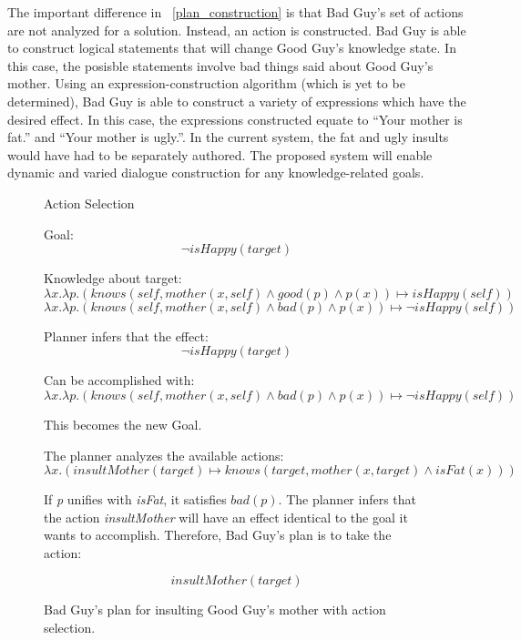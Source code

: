 \documentclass{article}
\begin{document}
The important difference in ~\ref{plan_construction} is that Bad Guy's
set of actions are not analyzed for a solution.  Instead, an action
is constructed.  Bad Guy is able to construct logical statements
that will change Good Guy's knowledge state.  In this case, the posisble
statements involve bad things said about Good Guy's mother.  Using
an expression-construction algorithm (which is yet to be determined),
Bad Guy is able to construct a variety of expressions which have the
desired effect.  In this case, the expressions constructed equate to
``Your mother is fat.'' and ``Your mother is ugly.''.  In the current
system, the fat and ugly insults would have had to be separately
authored.  The proposed system will enable dynamic and varied
dialogue construction for any knowledge-related goals.

\begin{figure}[h!]
  
  \begin{center}\large{Action Selection}\end{center}

  Goal:
  $$
  \neg isHappy(target)
  $$

  Knowledge about target:
  \[
  \lambda x.\lambda p.(knows(self, mother(x,self) \wedge good(p) \wedge p(x)) \mapsto isHappy(self))
  \]
  \[
  \lambda x.\lambda p.(knows(self, mother(x,self) \wedge bad(p) \wedge p(x)) \mapsto \neg isHappy(self))
  \]

  Planner infers that the effect:
  \[
  \neg isHappy(target)
  \]

  Can be accomplished with:
  \[
  \lambda x.\lambda p.(knows(self, mother(x,self) \wedge bad(p) \wedge p(x)) \mapsto \neg isHappy(self))
  \]

  This becomes the new Goal.

  The planner analyzes the available actions:
  \[
  \lambda x.(insultMother(target) \mapsto knows(target, mother(x, target) \wedge
  isFat(x))) 
  \]

  If \emph{p} unifies with \emph{isFat}, it satisfies $bad(p)$.  The planner infers that
  the action \emph{insultMother} will have an effect identical to the goal it wants to accomplish.
  Therefore, Bad Guy's plan is to take the action:
  
  \[
  insultMother(target)
  \]

  \caption{Bad Guy's plan for insulting Good Guy's mother with action selection.}
  \label{plan_selection}
\end{figure}
\end{document}
